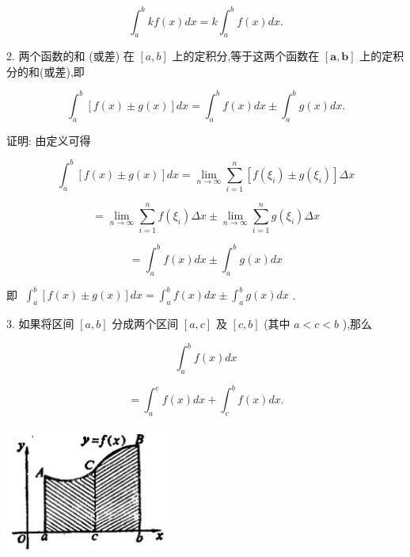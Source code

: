 \documentclass[lang=cn,newtx,10pt,scheme=chinese]{elegantbook}
\begin{document}
\[
{\int }_{a}^{b}{kf}\left( x\right) {dx} = k{\int }_{a}^{b}f\left( x\right) {dx}.
\]

2. 两个函数的和 (或差) 在 \(\left\lbrack {a,b}\right\rbrack\) 上的定积分,等于这两个函数在 \(\left\lbrack {\mathbf{a},\mathbf{b}}\right\rbrack\) 上的定积分的和(或差),即

\[
{\int }_{a}^{b}\left\lbrack {f\left( x\right) \pm g\left( x\right) }\right\rbrack {dx} = {\int }_{a}^{b}f\left( x\right) {dx} \pm {\int }_{a}^{b}g\left( x\right) {dx}.
\]

证明: 由定义可得

\[
{\int }_{a}^{b}\left\lbrack {f\left( x\right) \pm g\left( x\right) }\right\rbrack {dx} = \mathop{\lim }\limits_{{n \rightarrow \infty }}\mathop{\sum }\limits_{{i = 1}}^{n}\left\lbrack {f\left( {\xi }_{i}\right) \pm g\left( {\xi }_{i}\right) }\right\rbrack {\Delta x}
\]

\[
= \mathop{\lim }\limits_{{n \rightarrow \infty }}\mathop{\sum }\limits_{{i = 1}}^{n}f\left( {\xi }_{i}\right) {\Delta x} \pm \mathop{\lim }\limits_{{n \rightarrow \infty }}\mathop{\sum }\limits_{{i = 1}}^{n}g\left( {\xi }_{i}\right) {\Delta x}
\]

\[
= {\int }_{a}^{b}f\left( x\right) {dx} \pm {\int }_{a}^{b}g\left( x\right) {dx}
\]

即 \(\;{\int }_{a}^{b}\left\lbrack {f\left( x\right) \pm g\left( x\right) }\right\rbrack {dx} = {\int }_{a}^{b}f\left( x\right) {dx} \pm {\int }_{a}^{b}g\left( x\right) {dx}\) .

3. 如果将区间 \(\left\lbrack {a,b}\right\rbrack\) 分成两个区间 \(\left\lbrack {a,c}\right\rbrack\) 及 \(\left\lbrack {c,b}\right\rbrack\) (其中 \(a < c < b\) ),那么

\[
{\int }_{a}^{b}f\left( x\right) {dx}
\]

\[
= {\int }_{a}^{c}f\left( x\right) {dx} + {\int }_{c}^{b}f\left( x\right) {dx}.
\]

\begin{center}
\includegraphics[max width=0.4\textwidth]{images/01912c18-5c3f-733d-b775-749ba9897a9d_224_842112.jpg}
\end{center}
\end{document}
